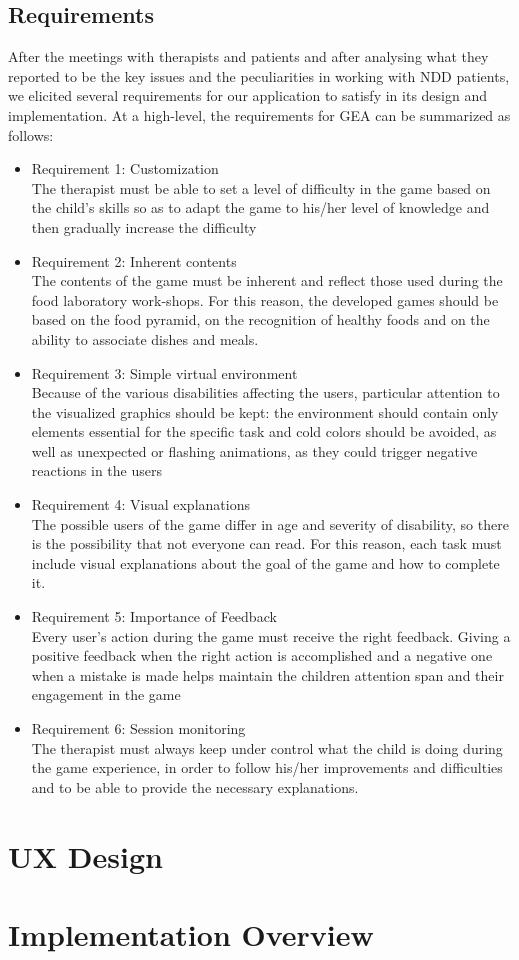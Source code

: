\subsection{Requirements}
After the meetings with therapists and patients and after analysing what they reported to be the key issues and the peculiarities in working with NDD patients, we elicited several requirements for our application to satisfy in its design and implementation.
At a high-level, the requirements for GEA can be summarized as follows:
\begin{itemize}
\item Requirement 1: Customization\\
The therapist must be able to set a level of difficulty in the game based on the child's skills so as to  adapt the game to his/her level of knowledge and then gradually increase the difficulty
\item Requirement 2: Inherent contents\\
The contents of the game must be inherent and reflect those used during the food laboratory work-shops.  For this reason, the developed games should be based on the food pyramid, on the recognition of healthy foods and on the ability to associate dishes and meals.
\item Requirement 3: Simple virtual environment\\
Because of the various disabilities affecting the users, particular attention to the visualized graphics should be kept: the environment should contain only elements essential for the specific task and cold colors should be avoided, as well as unexpected or flashing animations, as they could trigger negative reactions in the users
\item Requirement 4: Visual explanations\\
The possible users of the game differ in age and severity of disability, so there is the possibility that not everyone can read. For this reason, each task must include visual explanations about the goal of the game and how to complete it.
\item Requirement 5: Importance of Feedback\\
Every user's action during the game must receive the right feedback. Giving a positive feedback when the right action is accomplished and a negative one when a mistake is made helps maintain the children attention span and their engagement in the game
\item Requirement 6: Session monitoring\\
The therapist must always keep under control what the child is doing during the game experience, in order to follow his/her improvements and difficulties and to be able to provide the necessary explanations.
\end{itemize}
\section{UX Design}
\section{Implementation Overview}